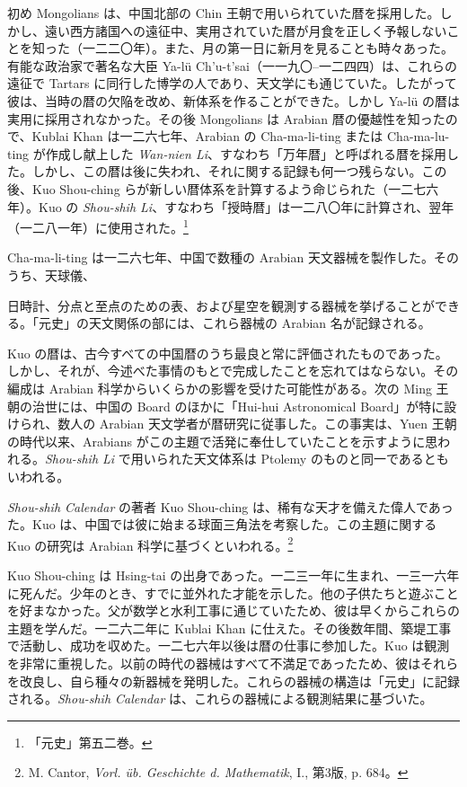 \documentclass[11pt]{article}
\newcommand{\scanpage}[2]{\clearpage\setcounter{footnote}{0}\noindent{\footnotesize\color{gray}PDF #1 頁 · #2}\par\medskip}
\newcommand{\scanfooter}{}
\begin{document}
初め Mongolians は、中国北部の Chin 王朝で用いられていた暦を採用した。しかし、遠い西方諸国への遠征中、実用されていた暦が月食を正しく予報しないことを知った（一二二〇年）。また、月の第一日に新月を見ることも時々あった。有能な政治家で著名な大臣 Ya-lü Ch'u-t'sai（一一九〇--一二四四）は、これらの遠征で Tartars に同行した博学の人であり、天文学にも通じていた。したがって彼は、当時の暦の欠陥を改め、新体系を作ることができた。しかし Ya-lü の暦は実用に採用されなかった。その後 Mongolians は Arabian 暦の優越性を知ったので、Kublai Khan は一二六七年、Arabian の Cha-ma-li-ting または Cha-ma-lu-ting が作成し献上した \emph{Wan-nien Li}、すなわち「万年暦」と呼ばれる暦を採用した。しかし、この暦は後に失われ、それに関する記録も何一つ残らない。この後、Kuo Shou-ching らが新しい暦体系を計算するよう命じられた（一二七六年）。Kuo の \emph{Shou-shih Li}、すなわち「授時暦」は一二八〇年に計算され、翌年（一二八一年）に使用された。\footnote{「元史」第五二巻。}

Cha-ma-li-ting は一二六七年、中国で数種の Arabian 天文器械を製作した。そのうち、天球儀、
\scanfooter

\scanpage{0115}{第15章、印刷頁101}
\setcounter{footnote}{0}
日時計、分点と至点のための表、および星空を観測する器械を挙げることができる。「元史」の天文関係の部には、これら器械の Arabian 名が記録される。

Kuo の暦は、古今すべての中国暦のうち最良と常に評価されたものであった。しかし、それが、今述べた事情のもとで完成したことを忘れてはならない。その編成は Arabian 科学からいくらかの影響を受けた可能性がある。次の Ming 王朝の治世には、中国の Board のほかに「Hui-hui Astronomical Board」が特に設けられ、数人の Arabian 天文学者が暦研究に従事した。この事実は、Yuen 王朝の時代以来、Arabians がこの主題で活発に奉仕していたことを示すように思われる。\emph{Shou-shih Li} で用いられた天文体系は Ptolemy のものと同一であるともいわれる。

\emph{Shou-shih Calendar} の著者 Kuo Shou-ching は、稀有な天才を備えた偉人であった。Kuo は、中国では彼に始まる球面三角法を考察した。この主題に関する Kuo の研究は Arabian 科学に基づくといわれる。\footnote{M. Cantor, \emph{Vorl. üb. Geschichte d. Mathematik}, I., 第3版, p. 684。}

Kuo Shou-ching は Hsing-tai の出身であった。一二三一年に生まれ、一三一六年に死んだ。少年のとき、すでに並外れた才能を示した。他の子供たちと遊ぶことを好まなかった。父が数学と水利工事に通じていたため、彼は早くからこれらの主題を学んだ。一二六二年に Kublai Khan に仕えた。その後数年間、築堤工事で活動し、成功を収めた。一二七六年以後は暦の仕事に参加した。Kuo は観測を非常に重視した。以前の時代の器械はすべて不満足であったため、彼はそれらを改良し、自ら種々の新器械を発明した。これらの器械の構造は「元史」に記録される。\emph{Shou-shih Calendar} は、これらの器械による観測結果に基づいた。
\end{document}
